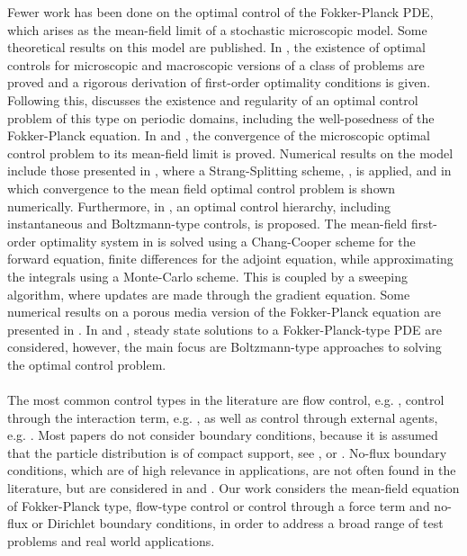 Fewer work has been done on the optimal control of the Fokker-Planck PDE, which arises as the mean-field limit of a stochastic microscopic model. Some theoretical results on this model are published. In \cite{albi2016mean}, the existence of optimal controls for microscopic and macroscopic versions of a class of problems are proved and a rigorous derivation of first-order optimality conditions is given. 
Following this, \cite{carrillo2019mean} discusses the existence and regularity of an optimal control problem of this type on periodic domains, including the well-posedness of the Fokker-Planck equation. In \cite{Pinnau_2017} and  \cite{carrillo2018no1}, the convergence of the microscopic optimal control problem to its mean-field limit is proved.
Numerical results on the model include those presented in \cite{Pinnau_2017}, where a Strang-Splitting scheme, \cite{gilbertstrang1}, is applied, and in which convergence to the mean field optimal control problem is shown numerically. Furthermore, in \cite{albi2016mean}, an optimal control hierarchy, including instantaneous and Boltzmann-type controls, is proposed. The mean-field first-order optimality system in \cite{albi2016mean} is solved using a Chang-Cooper scheme for the forward equation, finite differences for the adjoint equation, while approximating the integrals using a Monte-Carlo scheme. This is coupled by a sweeping algorithm, where updates are made through the gradient equation.
Some numerical results on a porous media version of the Fokker-Planck equation are presented in \cite{carrillo2018no1}. In \cite{Albi_2014no1} and \cite{albi2014kinetic}, steady state solutions to a Fokker-Planck-type PDE are considered, however, the main focus  are Boltzmann-type approaches to solving the optimal control problem.
\\
\\
The most common control types in the literature are flow control, e.g. \cite{albi2016mean}, control through the interaction term, e.g. \cite{Pinnau_2017}, as well as control through external agents, e.g. \cite{Fornasier_2014no2}. 
Most papers do not consider boundary conditions, because it is assumed that the particle distribution is of compact support, see \cite{burger2019meanfield}, \cite{fornasier_lisini_orrieri_savare_2019} or \cite{burger2016controlling}. No-flux boundary conditions, which are of high relevance in applications, are not often found in the literature, but are considered in \cite{albi2016mean} and \cite{carrillo2018no1}.
Our work considers the mean-field equation of Fokker-Planck type, flow-type control or control through a force term and no-flux or Dirichlet boundary conditions, in order to address a broad range of test problems and real world applications. 
